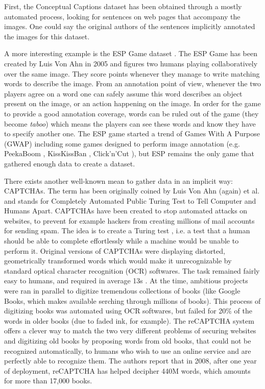 First, the Conceptual Captions dataset \cite{sharma-etal-2018-conceptual} has been obtained through a mostly automated process, looking for sentences on web pages that accompany the images. One could say the original authors of the sentences implicitly annotated the images for this dataset. 


A more interesting example is the ESP Game dataset \cite{von2005esp}. The ESP Game has been created by Luis Von Ahn in 2005 and figures two humans playing collaboratively over the same image. They score points whenever they manage to write matching words to describe the image. From an annotation point of view, whenever the two players agree on a word one can safely assume this word describes an object present on the image, or an action happening on the image. In order for the game to provide a good annotation coverage, words can be ruled out of the game (they become \textit{taboo}) which means the players can see these words and know they have to specify another one. The ESP game started a trend of Games With A Purpose (GWAP) \cite{von2008designing} including some games designed to perform image annotation (e.g. PeekaBoom \cite{von2006peekaboom}, KissKissBan \cite{ho2010kisskissban}, Click'n'Cut \cite{carlier2014click}), but ESP remains the only game that gathered enough data to create a dataset. 


There exists another well-known mean to gather data in an implicit way: CAPTCHAs. The term has been originally coined by Luis Von Ahn (again) et al. \cite{von2003captcha} and stands for Completely Automated Public Turing Test to Tell Computer and Humans Apart. CAPTCHAs have been created to stop automated attacks on websites, to prevent for example hackers from creating millions of mail accounts for sending spam. The idea is to create a Turing test \cite{machinery1950computing}, i.e. a test that a human should be able to complete effortlessly while a machine would be unable to perform it. Original versions of CAPTCHAs were displaying distorted, geometrically transformed words which would make it unrecognizable by standard optical character recognition (OCR) softwares. The task remained fairly easy to humans, and required in average 13s \cite{von2008recaptcha}. At the time, ambitious projects were ran in parallel to digitize tremendous collections of books (like Google Books, which makes available serching through millions of books). This process of digitizing books was automated using OCR softwares, but failed for 20\% of the words in older books (due to faded ink, for example). The reCAPTCHA system offers a clever way to match the two very different problems of securing websites and digitizing old books by proposing words from old books, that could not be recognized automatically, to humans who wish to use an online service and are perfectly able to recognize them. The authors report that in 2008, after one year of deployment, reCAPTCHA has helped decipher 440M words, which amounts for more than 17,000 books.

